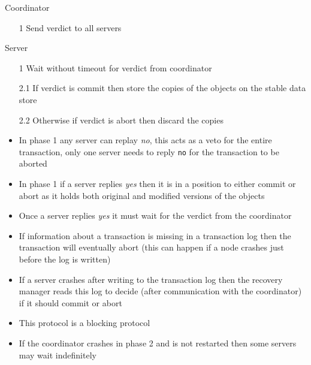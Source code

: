 \documentclass[a4paper]{article}
\begin{document}

\begin{minipage}[t]{0.5\textwidth}
  Coordinator

  \begin{enumerate}
    \item[1] Send verdict to all servers
  \end{enumerate}
\end{minipage}%
\begin{minipage}[t]{0.5\textwidth}
  Server

  \begin{enumerate}
    \item[1]   Wait without timeout for verdict from coordinator
    \item[2.1] If verdict is commit then store the copies of the objects on the
               stable data store
    \item[2.2] Otherwise if verdict is abort then discard the copies
  \end{enumerate}
\end{minipage}


\begin{itemize}
  \item In phase 1 any server can replay \textit{no}, this acts as a veto for
        the entire transaction, only one server needs to reply \texttt{no} for
        the transaction to be aborted
  \item In phase 1 if a server replies \textit{yes} then it is in a position
        to either commit or abort as it holds both original and modified
        versions of the objects
  \item Once a server replies \textit{yes} it must wait for the verdict from
        the coordinator
  \item If information about a transaction is missing in a transaction log then
        the transaction will eventually abort (this can happen if a node crashes
        just before the log is written)
  \item If a server crashes after writing to the transaction log then the
        recovery manager reads this log to decide (after communication with the
        coordinator) if it should commit or abort
  \item This protocol is a blocking protocol
  \item If the coordinator crashes in phase 2 and is not restarted then some
        servers may wait indefinitely
\end{itemize}
\end{document}
